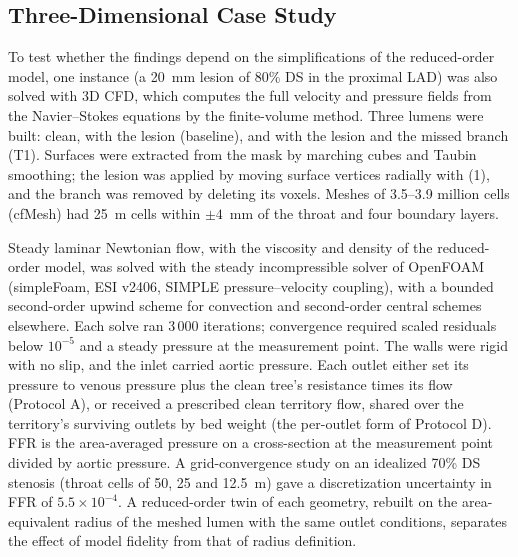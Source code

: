 \documentclass[journal]{IEEEtran}
\begin{document}
\subsection{Three-Dimensional Case Study}
To test whether the findings depend on the simplifications of the reduced-order model, one instance (a 20~mm lesion
of 80\% DS in the proximal LAD) was also solved with 3D CFD, which computes the full velocity and pressure fields
from the Navier--Stokes equations by the finite-volume method. Three lumens were built: clean, with the lesion (baseline), and with the
lesion and the missed branch (T1). Surfaces were extracted from the mask by marching cubes and Taubin smoothing; the
lesion was applied by moving surface vertices radially with (1), and the branch was removed by deleting its voxels.
Meshes of 3.5--3.9 million cells (cfMesh) had 25~\textmu m cells within $\pm 4$~mm of the throat and four boundary
layers.

Steady laminar Newtonian flow, with the viscosity and density of the reduced-order model, was solved with the
steady incompressible solver of OpenFOAM (simpleFoam, ESI v2406, SIMPLE pressure--velocity coupling), with a
bounded second-order upwind scheme for convection and second-order central schemes elsewhere. Each solve ran
3\,000 iterations; convergence required scaled residuals below $10^{-5}$ and a steady pressure at the measurement
point. The walls were rigid with no slip, and the inlet carried aortic pressure. Each outlet either set its pressure
to venous pressure plus the clean tree's resistance times its flow (Protocol A), or received a prescribed clean
territory flow, shared over the territory's surviving outlets by bed weight (the per-outlet form of Protocol D). FFR
is the area-averaged pressure on a cross-section at the measurement point divided by aortic pressure. A
grid-convergence study on an idealized 70\% DS stenosis (throat cells of 50, 25 and 12.5~\textmu m) gave a
discretization uncertainty in FFR of $5.5\times10^{-4}$. A reduced-order twin of each geometry, rebuilt on the
area-equivalent radius of the meshed lumen with the same outlet conditions, separates the effect of model fidelity
from that of radius definition.
\end{document}
